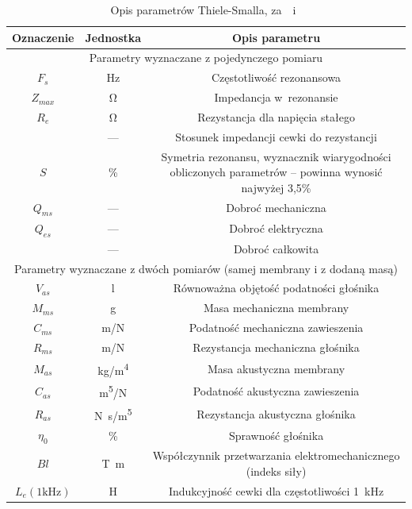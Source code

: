 \documentclass[12pt]{oska}
\begin{document}
			\begin{table}[!ht]
				\centering
				\caption{Opis parametrów Thiele-Smalla, za~\cite{BK_pulse_TS}~i~\cite{dobrucki}}
				\label{t:TS_opis}
				\begin{tabular}{|c|c|c|}
				\hline
					\textbf{Oznaczenie} & \textbf{Jednostka} & \textbf{Opis parametru}\\\hline\hline
					\multicolumn{3}{|c|}{Parametry wyznaczane z pojedynczego pomiaru} \\\hline\hline
					$F_s$ & \si{\hertz} & Częstotliwość rezonansowa \\\hline
					$Z_{max}$ & \si{\ohm} & Impedancja w~rezonansie \\\hline
					$R_e$ & \si{\ohm} & Rezystancja dla napięcia stałego \\\hline
					\gape{$r_0=\frac{Z_{max}}{R_e}$} & --- & Stosunek impedancji cewki do rezystancji \\\hline
					$S$ & \% & \makecell{Symetria rezonansu, wyznacznik wiarygodności\\obliczonych parametrów -- powinna wynosić najwyżej 3,5\%} \\\hline
					\hline
					$Q_{ms}$ & --- & Dobroć mechaniczna \\\hline
					$Q_{es}$ & --- & Dobroć elektryczna \\\hline
					\gape{$Q_{ts}=\frac{Q_{ms}\cdot Q_{es}}{Q_{ms}+Q_{es}}$} & --- & Dobroć całkowita \\\hline
					\hline
					\multicolumn{3}{|c|}{Parametry wyznaczane z dwóch pomiarów (samej membrany i z dodaną masą)} \\\hline\hline
					$V_{as}$ & \si{\litre} & Równoważna objętość podatności głośnika \\\hline
					$M_{ms}$ & \si{\gram} & Masa mechaniczna membrany \\\hline
					$C_{ms}$ & \si[per-mode=symbol]{\metre\per\newton} & Podatność mechaniczna zawieszenia \\\hline
					$R_{ms}$ & \si[per-mode=symbol]{\metre\per\newton} & Rezystancja mechaniczna głośnika \\\hline
					\hline
					$M_{as}$ & \si[per-mode=symbol]{\kilo\gram\per\metre\tothe{4}} & Masa akustyczna membrany \\\hline
					$C_{as}$ & \si[per-mode=symbol]{\metre\tothe{5}\per\newton} & Podatność akustyczna zawieszenia \\\hline
					$R_{as}$ & \si[per-mode=symbol]{\newton\s\per\metre\tothe{5}} & Rezystancja akustyczna głośnika \\\hline
					\hline
					$\eta_0$ & \% & Sprawność głośnika \\\hline
					$Bl$ & \si{\tesla\metre} & \makecell{Współczynnik przetwarzania elektromechanicznego\\(indeks siły)} \\\hline
					$L_{e} (1\si{\kilo\hertz})$ & \si{\henry} & Indukcyjność cewki dla częstotliwości \SI{1}{\kilo\hertz} \\\hline
				\end{tabular}
			\end{table}
\end{document}
